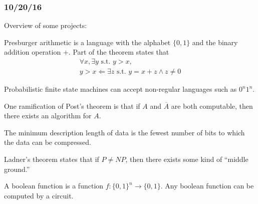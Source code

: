 \documentclass[a4paper,12pt]{article}
\theoremstyle{remark}
\theoremstyle{definition}
\begin{document}
\subsubsection*{10/20/16}
Overview of some projects: \par
Presburger arithmetic is a language with the alphabet $\{0, 1\}$ and the binary addition operation $+$. Part of the theorem states that
\begin{gather*}
    \forall x, \exists y \text{ s.t. } y > x, \\
    y > x \Leftarrow \exists z \text{ s.t. } y = x + z \land z \neq 0
\end{gather*} \par
Probabilistic finite state machines can accept non-regular languages such as $0^n 1^n$. \par
One ramification of Post's theorem is that if $A$ and $\overline{A}$ are both computable, then there exists an algorithm for $A$. \par
The minimum description length of data is the fewest number of bits to which the data can be compressed. \par
Ladner's theorem states that if $P \neq NP$, then there exists some kind of ``middle ground.'' \par
A boolean function is a function $f : \{ 0, 1 \}^n \to \{ 0, 1 \}$. Any boolean function can be computed by a circuit.
\end{document}
